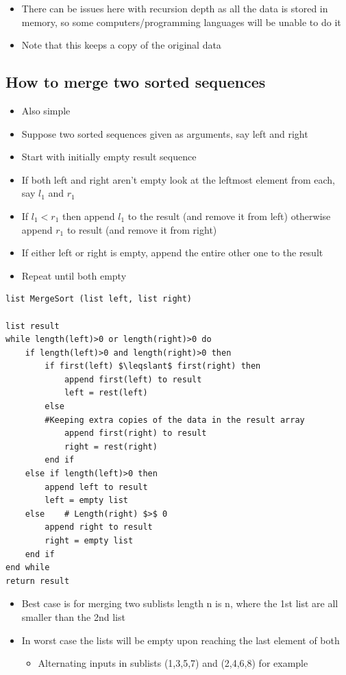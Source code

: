 \documentclass{article}[18pt]
\begin{document}
\begin{itemize}
	\item There can be issues here with recursion depth as all the data is stored in memory, so some computers/programming languages will be unable to do it
	\item Note that this keeps a copy of the original data
\end{itemize}




\subsection{How to merge two sorted sequences}
\begin{itemize}
	\item Also simple
	\item Suppose two sorted sequences given as arguments, say left and right
	\item Start with initially empty result sequence
	\item If both left and right aren't empty look at the leftmost element from each, say $l_1$ and $r_1$
	\item If $l_1<r_1$ then append $l_1$ to the result (and remove it from left) otherwise append $r_1$ to result (and remove it from right)
	\item If either left or right is empty, append the entire other one to the result
	\item Repeat until both empty
\end{itemize}
\newpage
\begin{lstlisting}
list MergeSort (list left, list right)

list result
while length(left)>0 or length(right)>0 do
	if length(left)>0 and length(right)>0 then
		if first(left) $\leqslant$ first(right) then
			append first(left) to result
			left = rest(left)
		else
		#Keeping extra copies of the data in the result array
			append first(right) to result
			right = rest(right)
		end if
	else if length(left)>0 then
		append left to result
		left = empty list
	else 	# Length(right) $>$ 0
		append right to result
		right = empty list
	end if
end while
return result
\end{lstlisting}
\begin{itemize}
	\item Best case is for merging two sublists length n is n, where the 1st list are all smaller than the 2nd list
	\item In worst case the lists will be empty upon reaching the last element of both
	\begin{itemize}
		\item Alternating inputs in sublists (1,3,5,7) and (2,4,6,8) for example
	\end{itemize}
\end{itemize}
\end{document}
